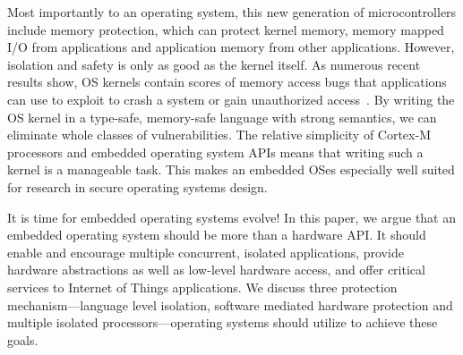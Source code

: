 Most importantly to an operating system, this new generation of microcontrollers include
memory protection, which can protect kernel memory, memory mapped I/O
from applications and application memory from other applications. However,
isolation and safety is only as good as the kernel itself. As numerous recent
results show, OS kernels contain scores of memory access bugs that applications
can use to exploit to crash a system or gain unauthorized
access~\cite{nickolai}. By writing the OS kernel in a type-safe, memory-safe
language with strong semantics, we can eliminate whole classes of
vulnerabilities. The relative simplicity of Cortex-M processors and embedded
operating system APIs means that writing such a kernel is a manageable task.
This makes an embedded OSes especially well suited for research in
secure operating systems design.

It is time for embedded operating systems evolve! In this paper, we argue
that an embedded operating system should be more than a hardware API.
It should enable and encourage
multiple concurrent, isolated applications, provide  hardware abstractions
as well as low-level hardware access, and offer critical services to Internet
of Things applications. We discuss three protection
mechanism---language level isolation, software mediated hardware protection and
multiple isolated processors---operating systems should utilize to achieve
these goals.


%
